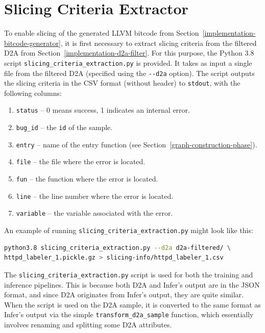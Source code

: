 \section{Slicing Criteria Extractor}
\label{implementation-slicing-info}
To enable slicing of the generated LLVM bitcode from Section~\ref{implementation-bitcode-generator}, it is first necessary to extract slicing criteria from the filtered D2A from Section~\ref{implementation-d2a-filter}. For this purpose, the Python 3.8 script \texttt{slicing\_criteria\_extraction.py} is provided. It takes as input a single file from the filtered D2A (specified using the \texttt{-{}-d2a} option). The script outputs the slicing criteria in the CSV format (without header) to \texttt{stdout}, with the following columns:

\begin{enumerate}
    \item \texttt{status} -- 0 means success, 1 indicates an internal error.
    \item \texttt{bug\_id} -- the \texttt{id} of the sample.
    \item \texttt{entry} -- name of the entry function (see Section~\ref{graph-construction-phase}).
    \item \texttt{file} -- the file where the error is located.
    \item \texttt{fun} -- the function where the error is located.
    \item \texttt{line} -- the line number where the error is located.
    \item \texttt{variable} -- the variable associated with the error.
\end{enumerate}

An example of running \texttt{slicing\_criteria\_extraction.py} might look like this:
\begin{lstlisting}[language=bash, xleftmargin=2em]
python3.8 slicing_criteria_extraction.py --d2a d2a-filtered/ \ 
httpd_labeler_1.pickle.gz > slicing-info/httpd_labeler_1.csv
\end{lstlisting}

The \texttt{slicing\_criteria\_extraction.py} script is used for both the training and inference pipelines. This is because both D2A and Infer's output are in the JSON format, and since D2A originates from Infer's output, they are quite similar. When the script is used on the D2A sample, it is converted to the same format as Infer's output via the simple \texttt{transform\_d2a\_sample} function, which essentially involves renaming and splitting some D2A attributes.

